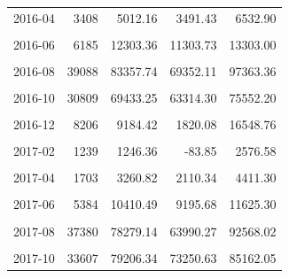 \begin{longtable}[t]{crrrr}
2016-04 & 3408 & 5012.16 & 3491.43 & 6532.90\\
\cellcolor{gray!10}{2016-05} & \cellcolor{gray!10}{3287} & \cellcolor{gray!10}{6101.33} & \cellcolor{gray!10}{5451.50} & \cellcolor{gray!10}{6751.16}\\
2016-06 & 6185 & 12303.36 & 11303.73 & 13303.00\\
\cellcolor{gray!10}{2016-07} & \cellcolor{gray!10}{19242} & \cellcolor{gray!10}{25390.48} & \cellcolor{gray!10}{21439.27} & \cellcolor{gray!10}{29341.69}\\
2016-08 & 39088 & 83357.74 & 69352.11 & 97363.36\\
\cellcolor{gray!10}{2016-09} & \cellcolor{gray!10}{42209} & \cellcolor{gray!10}{88072.45} & \cellcolor{gray!10}{76624.70} & \cellcolor{gray!10}{99520.20}\\
2016-10 & 30809 & 69433.25 & 63314.30 & 75552.20\\
\cellcolor{gray!10}{2016-11} & \cellcolor{gray!10}{19160} & \cellcolor{gray!10}{34739.87} & \cellcolor{gray!10}{28884.25} & \cellcolor{gray!10}{40595.49}\\
2016-12 & 8206 & 9184.42 & 1820.08 & 16548.76\\
\cellcolor{gray!10}{2017-01} & \cellcolor{gray!10}{2253} & \cellcolor{gray!10}{1654.38} & \cellcolor{gray!10}{-562.45} & \cellcolor{gray!10}{3871.21}\\
2017-02 & 1239 & 1246.36 & -83.85 & 2576.58\\
\cellcolor{gray!10}{2017-03} & \cellcolor{gray!10}{1920} & \cellcolor{gray!10}{2123.06} & \cellcolor{gray!10}{434.78} & \cellcolor{gray!10}{3811.34}\\
2017-04 & 1703 & 3260.82 & 2110.34 & 4411.30\\
\cellcolor{gray!10}{2017-05} & \cellcolor{gray!10}{2571} & \cellcolor{gray!10}{4717.32} & \cellcolor{gray!10}{3882.71} & \cellcolor{gray!10}{5551.93}\\
2017-06 & 5384 & 10410.49 & 9195.68 & 11625.30\\
\cellcolor{gray!10}{2017-07} & \cellcolor{gray!10}{17568} & \cellcolor{gray!10}{24254.82} & \cellcolor{gray!10}{21066.40} & \cellcolor{gray!10}{27443.24}\\
2017-08 & 37380 & 78279.14 & 63990.27 & 92568.02\\
\cellcolor{gray!10}{2017-09} & \cellcolor{gray!10}{72895} & \cellcolor{gray!10}{208062.75} & \cellcolor{gray!10}{193234.85} & \cellcolor{gray!10}{222890.65}\\
2017-10 & 33607 & 79206.34 & 73250.63 & 85162.05\\

\end{longtable}
